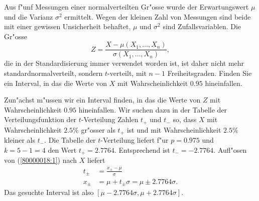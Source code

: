 Aus f"unf Messungen einer normalverteilten Gr"osse wurde der Erwartungswert
$\mu$ und die Varianz $\sigma^2$ ermittelt.
Wegen der kleinen Zahl von Messungen sind beide mit einer gewissen
Unsicherheit behaftet, $\mu$ und  $\sigma^2$ sind Zufallsvariablen.
Die Gr"osse
\begin{equation}
Z=\frac{X-\mu(X_1,\dots,X_n)}{\sigma(X_1,\dots,X_n)},
\label{80000018:1}
\end{equation}
die in der Standardisierung immer verwendet worden ist, ist daher
nicht mehr standardnormalverteilt, sondern $t$-verteilt, mit $n-1$ 
Freiheitsgraden. Finden Sie ein Interval, in das die Werte von $X$
mit Wahrscheinlichkeit $0.95$ hineinfallen.

\begin{loesung}
Zun"achst m"ussen wir ein Interval finden, in das die Werte von
$Z$ mit Wahrscheinlichkeit $0.95$ hineinfallen. Wir suchen dazu in
der Tabelle der Verteilungsfunktion der $t$-Verteilung Zahlen $t_+$
und $t_-$ so, dass $X$ mit Wahrscheinlichkeit $2.5\%$ gr"osser als $t_+$
ist und mit Wahrscheinlichkeit $2.5\%$ kleiner als $t_-$. Die Tabelle
der $t$-Verteilung liefert f"ur $p=0.975$ und $k=5-1=4$ den Wert
$t_+=2.7764$. Entsprechend ist $t_-=-2.7764$. Aufl"osen von
(\ref{80000018:1}) nach $X$ liefert
\begin{align*}
t_\pm &=\frac{x_{\pm}-\mu}{\sigma}\\
x_\pm&=\mu +t_\pm\sigma = \mu \pm 2.7764\sigma.
\end{align*}
Das gesuchte Interval ist also $[\mu-2.7764\sigma,\mu+2.7764\sigma]$.
\end{loesung}
